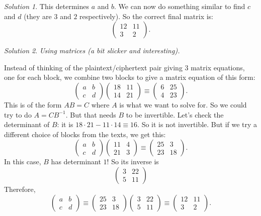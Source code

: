 \documentclass{article}
\theoremstyle{plain}
\theoremstyle{definition}
\theoremstyle{remark}
\newtheorem*{solution}{Solution}
\numberwithin{theorem}{section}
\begin{document}
\begin{solution}
This determines $a$ and $b$.  We can now do something similar to find $c$ and $d$ (they are $3$ and $2$ respectively).
So the correct final matrix is:
\[
	\begin{pmatrix}
		12 & 11 \\ 3 & 2
	\end{pmatrix}.
\]
\end{solution}

\begin{solution}
\emph{Using matrices (a bit slicker and interesting).}


Instead of thinking of the plaintext/ciphertext pair giving 3 matrix equations, one for each block, we combine two blocks to give a matrix equation of this form:
\[
	\begin{pmatrix}
		a & b \\ c & d
	\end{pmatrix}
	\begin{pmatrix}
		18 & 11 \\ 14 & 21
	\end{pmatrix}
	\equiv
	\begin{pmatrix}
		6 & 25 \\ 4 & 23 
	\end{pmatrix}.
\]
This is of the form $AB = C$ where $A$ is what we want to solve for.  So we could try to do $A = CB^{-1}$.  But that needs $B$ to be invertible.  Let's check the determinant of $B$:  it is $18 \cdot 21 - 11 \cdot 14 \equiv 16$.  So it is not invertible.  But if we try a different choice of blocks from the texts, we get this:
\[
	\begin{pmatrix}
		a & b \\ c & d
	\end{pmatrix}
	\begin{pmatrix}
		11 & 4 \\ 21 & 3
	\end{pmatrix}
	\equiv
	\begin{pmatrix}
		25 & 3 \\ 23 & 18
	\end{pmatrix}.
\]
In this case, $B$ has determinant $1$!  So its inverse is
\[
	\begin{pmatrix}
		3 & 22 \\ 5 & 11
	\end{pmatrix}
\]
Therefore, 
\[
	\begin{pmatrix}
		a & b \\ c & d
	\end{pmatrix}
	\equiv
	\begin{pmatrix}
		25 & 3 \\ 23 & 18
	\end{pmatrix}
	\begin{pmatrix}
		3 & 22 \\ 5 & 11 
	\end{pmatrix}
	\equiv
	\begin{pmatrix}
		12 & 11 \\ 3 & 2
	\end{pmatrix}.
\]
\end{solution}
\end{document}
